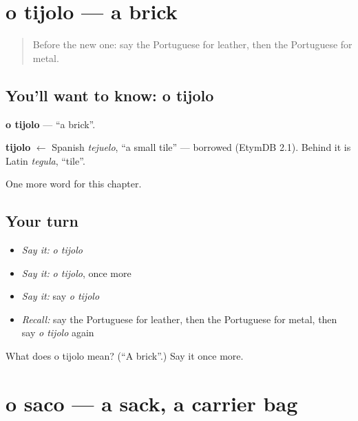 \section[o tijolo]{o tijolo — a brick}

\label{lesson:PT-C165-tijolo}



\begin{quote}
Before the new one: say the Portuguese for leather, then the Portuguese for metal.
\end{quote}

\subsection*{You'll want to know: o tijolo}
\textbf{o tijolo} — \textquotedblleft{}a brick\textquotedblright{}.

\begin{cousinweb}
\textbf{tijolo} $\leftarrow$ Spanish \emph{tejuelo}, \textquotedblleft{}a small tile\textquotedblright{} — borrowed (EtymDB 2.1). Behind it is Latin \emph{tegula}, \textquotedblleft{}tile\textquotedblright{}.
\end{cousinweb}

\begin{grammarlens}[title={What you've built}]
One more word for this chapter.
\end{grammarlens}

\subsection*{Your turn}
\begin{itemize}
\raggedright
  \item \emph{Say it:} \emph{o tijolo}
  \item \emph{Say it:} \emph{o tijolo}, once more
  \item \emph{Say it:} say \emph{o tijolo}
  \item \emph{Recall:} say the Portuguese for leather, then the Portuguese for metal, then say \emph{o tijolo} again
\end{itemize}

\begin{tcolorbox}[breakable,colback=teal!4,colframe=teal!35!black,title={Before you move on}]
What does o tijolo mean? (\textquotedblleft{}A brick\textquotedblright{}.) Say it once more.
\end{tcolorbox}
\section[o saco]{o saco — a sack, a carrier bag}

